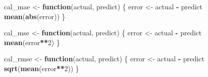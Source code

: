 \documentclass[
]{article}
\newenvironment{Shaded}{\begin{snugshade}}{\end{snugshade}}
\newcommand{\ControlFlowTok}[1]{\textcolor[rgb]{0.13,0.29,0.53}{\textbf{#1}}}
\newcommand{\DecValTok}[1]{\textcolor[rgb]{0.00,0.00,0.81}{#1}}
\newcommand{\FunctionTok}[1]{\textcolor[rgb]{0.13,0.29,0.53}{\textbf{#1}}}
\newcommand{\NormalTok}[1]{#1}
\newcommand{\OtherTok}[1]{\textcolor[rgb]{0.56,0.35,0.01}{#1}}
\newcommand{\SpecialCharTok}[1]{\textcolor[rgb]{0.81,0.36,0.00}{\textbf{#1}}}
\begin{document}
\begin{Shaded}
\begin{Highlighting}[]
\NormalTok{cal\_mae }\OtherTok{\textless{}{-}} \ControlFlowTok{function}\NormalTok{(actual, predict) \{}
\NormalTok{  error }\OtherTok{\textless{}{-}}\NormalTok{ actual }\SpecialCharTok{{-}}\NormalTok{ predict}
  \FunctionTok{mean}\NormalTok{(}\FunctionTok{abs}\NormalTok{(error))}
\NormalTok{\}}

\NormalTok{cal\_mse }\OtherTok{\textless{}{-}} \ControlFlowTok{function}\NormalTok{(actual, predict) \{}
\NormalTok{  error }\OtherTok{\textless{}{-}}\NormalTok{ actual }\SpecialCharTok{{-}}\NormalTok{ predict}
  \FunctionTok{mean}\NormalTok{(error}\SpecialCharTok{**}\DecValTok{2}\NormalTok{)}
\NormalTok{\}}

\NormalTok{cal\_rmse }\OtherTok{\textless{}{-}} \ControlFlowTok{function}\NormalTok{(actual, predict) \{}
\NormalTok{  error }\OtherTok{\textless{}{-}}\NormalTok{ actual }\SpecialCharTok{{-}}\NormalTok{ predict}
  \FunctionTok{sqrt}\NormalTok{(}\FunctionTok{mean}\NormalTok{(error}\SpecialCharTok{**}\DecValTok{2}\NormalTok{))}
\NormalTok{\}}


\end{Highlighting}
\end{Shaded}
\end{document}
